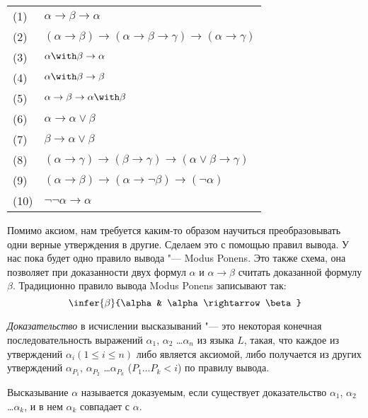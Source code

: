 \begin{tabular}{ll}
(1) & $\alpha \rightarrow \beta \rightarrow \alpha$ \\
(2) & $(\alpha \rightarrow \beta) \rightarrow (\alpha \rightarrow \beta \rightarrow \gamma) \rightarrow (\alpha \rightarrow \gamma)$ \\
(3) & $\alpha \with \beta \rightarrow \alpha$\\
(4) & $\alpha \with \beta \rightarrow \beta$\\
(5) & $\alpha \rightarrow \beta \rightarrow \alpha \with \beta$\\
(6) & $\alpha \rightarrow \alpha \vee \beta$\\
(7) & $\beta \rightarrow \alpha \vee \beta$\\
(8) & $(\alpha \rightarrow \gamma) \rightarrow (\beta \rightarrow \gamma) \rightarrow (\alpha \vee \beta \rightarrow \gamma)$\\
(9) & $(\alpha \rightarrow \beta) \rightarrow (\alpha \rightarrow \neg \beta) \rightarrow (\neg \alpha)$\\
(10) & $\neg \neg \alpha \rightarrow \alpha$
\end{tabular}

Помимо аксиом, нам требуется каким-то образом научиться преобразовывать одни верные утверждения
в другие.
Сделаем это с помощью правил вывода. У нас пока будет одно правило вывода "--- Modus Ponens.
Это также схема, она позволяет при доказанности двух формул $\alpha$ и $\alpha \rightarrow \beta$
считать доказанной формулу $\beta$. Традиционно правило вывода Modus Ponens записывают так:
$$\infer{\beta}{\alpha & \alpha \rightarrow \beta}$$

\begin{definition}[доказательство] \emph{Доказательство} в исчислении высказываний "--- 
это некоторая конечная последовательность выражений 
$\alpha_1$, $\alpha_2$ \dots $\alpha_n$
из языка $L$, такая, что каждое из утверждений $\alpha_i (1 \le i \le n)$
либо является аксиомой, либо получается из других
утверждений $\alpha_{P_1}$, $\alpha_{P_2}$ \dots $\alpha_{P_k}$ 
($P_1 \dots P_k < i$) по правилу вывода.
\end{definition}

\begin{definition}[доказуемость] Высказывание $\alpha$ называется доказуемым, если 
существует доказательство $\alpha_1$, $\alpha_2$ \dots $\alpha_k$, и в нем
$\alpha_k$ совпадает с $\alpha$. 
\end{definition}

